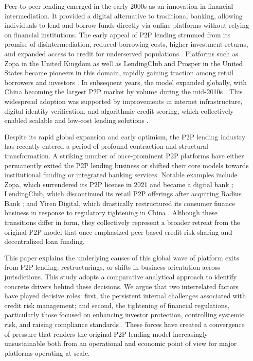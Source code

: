 \documentclass[pdflatex,sn-apa]{sn-jnl}%
\theoremstyle{thmstyleone}%
\theoremstyle{thmstyletwo}%
\theoremstyle{thmstylethree}%
\begin{document}
Peer-to-peer lending emerged in the early 2000s as an innovation in financial intermediation. It provided a digital alternative to traditional banking, allowing individuals to lend and borrow funds directly via online platforms without relying on financial institutions. The early appeal of P2P lending stemmed from its promise of disintermediation, reduced borrowing costs, higher investment returns, and expanded access to credit for underserved populations \citep{klafft_peer_2008, freedman_information_2017}. Platforms such as Zopa in the United Kingdom as well as LendingClub and Prosper in the United States became pioneers in this domain, rapidly gaining traction among retail borrowers and investors \citep{Morse2015463}. In subsequent years, the model expanded globally, with China becoming the largest P2P market by volume during the mid-2010s \citep{huang_online_2018}. This widespread adoption was supported by improvements in internet infrastructure, digital identity verification, and algorithmic credit scoring, which collectively enabled scalable and low-cost lending solutions \citep{bone-winkel_improving_2024}.

Despite its rapid global expansion and early optimism, the P2P lending industry has recently entered a period of profound contraction and structural transformation. A striking number of once-prominent P2P platforms have either permanently exited the P2P lending business or shifted their core models towards institutional funding or integrated banking services. Notable examples include Zopa, which surrendered its P2P license in 2021 and became a digital bank \citep{zopa_bank_limited_zopa_2021,zopa_bank_limited_our_2023}; LendingClub, which discontinued its retail P2P offerings after acquiring Radius Bank \citep{frankel_lendingclub_2020}; and Yiren Digital, which drastically restructured its consumer finance business in response to regulatory tightening in China \citep{economic_daily_p2p_2015, nemoto_optimal_2019}. Although these transitions differ in form, they collectively represent a broader retreat from the original P2P model that once emphasized peer-based credit risk sharing and decentralized loan funding.

This paper explains the underlying causes of this global wave of platform exits from P2P lending, restructurings, or shifts in business orientation across jurisdictions. This study adopts a comparative analytical approach to identify concrete drivers behind these decisions. We argue that two interrelated factors have played decisive roles: first, the persistent internal challenges associated with credit risk management; and second, the tightening of financial regulations, particularly those focused on enhancing investor protection, controlling systemic risk, and raising compliance standards \citep{ma_can_2022,shen_empirical_2021}. These forces have created a convergence of pressure that renders the original P2P lending model increasingly unsustainable both from an operational and economic point of view for major platforms operating at scale.
\end{document}
